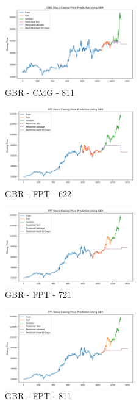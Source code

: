 \documentclass{ieeeojies}
\begin{document}
\begin{figure} [H]
    \centering
    \includegraphics[width=0.5\textwidth]{bibliography/Figure/GBR_CMG_811_90.png}
    \caption{GBR - CMG - 811}
    \label{fig:GBR_CMG_811_90}
\end{figure}
\begin{figure} [H]
    \centering
    \includegraphics[width=0.5\textwidth]{bibliography/Figure/GBR_FPT_622_90.png}
    \caption{GBR - FPT - 622}
    \label{fig:GBR_FPT_622_90}
\end{figure}
\begin{figure} [H]
    \centering
    \includegraphics[width=0.5\textwidth]{bibliography/Figure/GBR_FPT_721_90.png}
    \caption{GBR - FPT - 721}
    \label{fig:GBR_FPT_721_90}
\end{figure}
\begin{figure} [H]
    \centering
    \includegraphics[width=0.5\textwidth]{bibliography/Figure/GBR_FPT_811_90.png}
    \caption{GBR - FPT - 811}
    \label{fig:GBR_FPT_811_90}
\end{figure}
\end{document}
